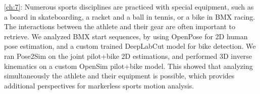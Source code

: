 \noindent\autoref{ch:7}: Numerous sports disciplines are practiced with special equipment, such as a board in skateboarding, a racket and a ball in tennis, or a bike in BMX racing. The interactions between the athlete and their gear are often important to retrieve. We analyzed BMX start sequences, by using OpenPose for 2D human pose estimation, and a custom trained DeepLabCut model for bike detection. We ran Pose2Sim on the joint {pilot+bike} 2D estimations, and performed 3D inverse kinematics on a custom OpenSim {pilot+bike} model. This showed that analyzing simultaneously the athlete and their equipment is possible, which provides additional perspectives for markerless sports motion analysis. 


